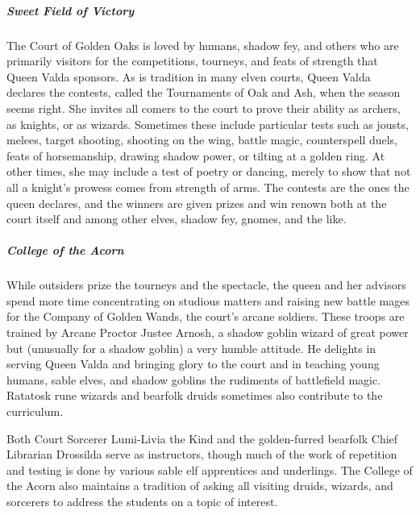 \documentclass[10pt,a4paper,twoside,bg=print,twocolumn,openany,nodeprecatedcode]{dndbook}
\begin{document}
\subparagraph{Sweet Field of Victory}
The Court of Golden Oaks is loved by humans, shadow fey, and others who are primarily visitors for the competitions, tourneys, and feats of strength that Queen Valda sponsors. As is tradition in many elven courts, Queen Valda declares the contests, called the Tournaments of Oak and Ash, when the season seems right. She invites all comers to the court to prove their ability as archers, as knights, or as wizards. Sometimes these include particular tests such as jousts, melees, target shooting, shooting on the wing, battle magic, counterspell duels, feats of horsemanship, drawing shadow power, or tilting at a golden ring. At other times, she may include a test of poetry or dancing, merely to show that not all a knight's prowess comes from strength of arms. The contests are the ones the queen declares, and the winners are given prizes and win renown both at the court itself and among other elves, shadow fey, gnomes, and the like.

\subparagraph{College of the Acorn}
While outsiders prize the tourneys and the spectacle, the queen and her advisors spend more time concentrating on studious matters and raising new battle mages for the Company of Golden Wands, the court's arcane soldiers. These troops are trained by Arcane Proctor Justee Arnosh, a shadow goblin wizard of great power but (unusually for a shadow goblin) a very humble attitude. He delights in serving Queen Valda and bringing glory to the court and in teaching young humans, sable elves, and shadow goblins the rudiments of battlefield magic. Ratatosk rune wizards and bearfolk druids sometimes also contribute to the curriculum.

Both Court Sorcerer Lumi-Livia the Kind and the golden-furred bearfolk Chief Librarian Drossilda serve as instructors, though much of the work of repetition and testing is done by various sable elf apprentices and underlings. The College of the Acorn also maintains a tradition of asking all visiting druids, wizards, and sorcerers to address the students on a topic of interest.
\end{document}
